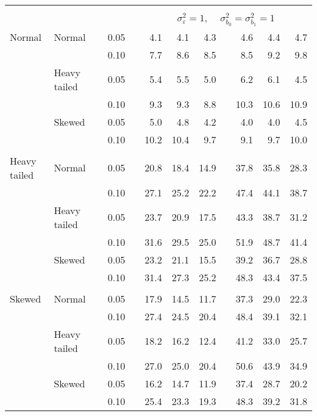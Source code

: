 \begin{table}[ht]
\begin{scriptsize}
\begin{tabular}{ll p{.1cm} c p{.1cm} rrr p{.1cm} rrr}
&&&&&&&&&&&\\
& && && \multicolumn{7}{c}{$\sigma_{\varepsilon}^2 = 1$, \ \ $\sigma_{b_0}^2 = \sigma_{b_1}^2 = 1$} \\ \cline{6-12}
\rowcolor{gray!20} Normal & Normal &  & 0.05 &  & 4.1 & 4.1 & 4.3 &  & 4.6 & 4.4 & 4.7 \\ 
\rowcolor{gray!20}    &  &  & 0.10 &  & 7.7 & 8.6 & 8.5 &  & 8.5 & 9.2 & 9.8 \\ 
\rowcolor{gray!20}    & Heavy tailed &  & 0.05 &  & 5.4 & 5.5 & 5.0 &  & 6.2 & 6.1 & 4.5 \\ 
\rowcolor{gray!20}    &  &  & 0.10 &  & 9.3 & 9.3 & 8.8 &  & 10.3 & 10.6 & 10.9 \\ 
\rowcolor{gray!20}    & Skewed &  & 0.05 &  & 5.0 & 4.8 & 4.2 &  & 4.0 & 4.0 & 4.5 \\ 
\rowcolor{gray!20}    &  &  & 0.10 &  & 10.2 & 10.4 & 9.7 &  & 9.1 & 9.7 & 10.0 \\ 
&&&&&&&&&&&\\
  Heavy tailed & Normal &  & 0.05 &  & 20.8 & 18.4 & 14.9 &  & 37.8 & 35.8 & 28.3 \\ 
  &  &  & 0.10 &  & 27.1 & 25.2 & 22.2 &  & 47.4 & 44.1 & 38.7 \\ 
  & Heavy tailed &  & 0.05 &  & 23.7 & 20.9 & 17.5 &  & 43.3 & 38.7 & 31.2 \\ 
  &  &  & 0.10 &  & 31.6 & 29.5 & 25.0 &  & 51.9 & 48.7 & 41.4 \\ 
  & Skewed &  & 0.05 &  & 23.2 & 21.1 & 15.5 &  & 39.2 & 36.7 & 28.8 \\ 
  &  &  & 0.10 &  & 31.4 & 27.3 & 25.2 &  & 48.3 & 43.4 & 37.5 \\ 
&&&&&&&&&&&\\
  Skewed & Normal &  & 0.05 &  & 17.9 & 14.5 & 11.7 &  & 37.3 & 29.0 & 22.3 \\ 
   &  &  & 0.10 &  & 27.4 & 24.5 & 20.4 &  & 48.4 & 39.1 & 32.1 \\ 
   & Heavy tailed &  & 0.05 &  & 18.2 & 16.2 & 12.4 &  & 41.2 & 33.0 & 25.7 \\ 
   &  &  & 0.10 &  & 27.0 & 25.0 & 20.4 &  & 50.6 & 43.9 & 34.9 \\ 
   & Skewed &  & 0.05 &  & 16.2 & 14.7 & 11.9 &  & 37.4 & 28.7 & 20.2 \\ 
   &  &  & 0.10 &  & 25.4 & 23.3 & 19.3 &  & 48.3 & 39.2 & 31.8 \\ 


\end{tabular}
\end{scriptsize}
\end{table}
